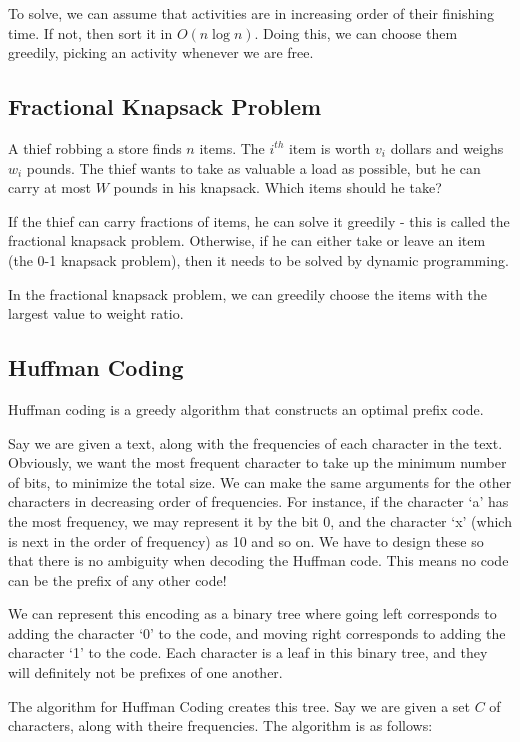 \documentclass[12pt,letterpaper]{article}
\theoremstyle{definition}
\begin{document}
To solve, we can assume that activities are in increasing order of their finishing time. If not, then sort it in $O(n \log n)$. Doing this, we can choose them greedily, picking an activity whenever we are free.

\subsection{Fractional Knapsack Problem}

A thief robbing a store finds $n$ items. The $i^{th}$  item is worth $v_i$ dollars and weighs $w_i$ pounds. The thief wants to take as valuable a load as possible, but he can carry at most $W$ pounds in his knapsack. Which items should he take?

If the thief can carry fractions of items, he can solve it greedily - this is called the fractional knapsack problem. Otherwise, if he can either take or leave an item (the 0-1 knapsack problem), then it needs to be solved by dynamic programming.

In the fractional knapsack problem, we can greedily choose the items with the largest value to weight ratio.

\subsection{Huffman Coding}

Huffman coding is a greedy algorithm that constructs an optimal prefix code.

Say we are given a text, along with the frequencies of each character in the text. Obviously, we want the most frequent character to take up the minimum number of bits, to minimize the total size. We can make the same arguments for the other characters in decreasing order of frequencies. For instance, if the character `a' has the most frequency, we may represent it by the bit 0, and the character `x' (which is next in the order of frequency) as 10 and so on. We have to design these so that there is no ambiguity when decoding the Huffman code. This means no code can be the prefix of any other code!

We can represent this encoding as a binary tree where going left corresponds to adding the character `0' to the code, and moving right corresponds to adding the character `1' to the code. Each character is a leaf in this binary tree, and they will definitely not be prefixes of one another.

The algorithm for Huffman Coding creates this tree. Say we are given a set $C$ of characters, along with theire frequencies. The algorithm is as follows:
\end{document}
